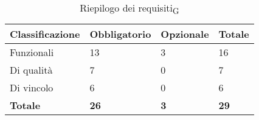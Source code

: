 \begin{table}[h]
	\centering
	\begin{tabular}{| p{} | p{} | p{} | p{} |} 
		\hline
		\textbf{Classificazione} & \textbf{Obbligatorio} & \textbf{Opzionale} & \textbf{Totale} \\
		\hline
		Funzionali & 13 & 3 & 16\\
		\hline
		Di qualità & 7 & 0 & 7\\
		\hline
		Di vincolo & 6 & 0 & 6\\
		\hline
		\textbf{Totale} & \textbf{26} &\textbf {3} &  \textbf{29}\\
		\hline
	\end{tabular}
	\caption{Riepilogo dei requisiti\textsubscript{G}}
\end{table}
